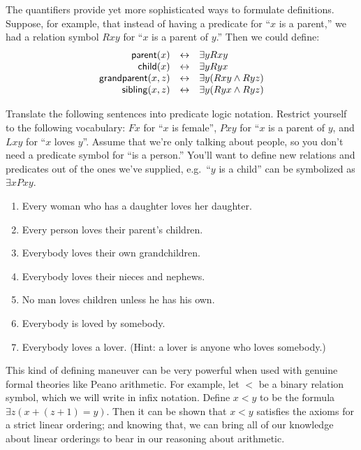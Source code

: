 The quantifiers provide yet more sophisticated ways to formulate
definitions.  Suppose, for example, that instead of having a predicate
for ``$x$ is a parent,'' we had a relation symbol $Rxy$ for ``$x$ is a
parent of $y$.''  Then we could define:
\[ \begin{array}{r c l}
     \mathsf{parent}(x) & \leftrightarrow & \exists yRxy \\
     \mathsf{child}(x)  & \leftrightarrow & \exists yRyx \\
     \mathsf{grandparent}(x,z) & \leftrightarrow & \exists y(Rxy\wedge Ryz) \\
     \mathsf{sibling}(x,z) & \leftrightarrow & \exists y(Ryx\wedge Ryz) \end{array} \]

\begin{exercises} Translate the following sentences into predicate
   logic notation.  Restrict yourself to the following vocabulary:
   $Fx$ for ``$x$ is female'', $Pxy$ for ``$x$ is a parent of $y$, and
   $Lxy$ for ``$x$ loves $y$''.  Assume that we're only talking about
   people, so you don't need a predicate symbol for ``is a person.''
   You'll want to define new relations and predicates out of the ones
   we've supplied, e.g.\ ``$y$ is a child'' can be symbolized as
   $\exists xPxy$.

 \begin{enumerate}
  
\item Every woman who has a daughter loves her daughter.

\item Every person loves their parent's children.  
  
\item Everybody loves their own grandchildren.
  
\item Everybody loves their nieces and nephews.
  
\item No man loves children unless he has his own.

\item Everybody is loved by somebody.   

\item Everybody loves a lover. (Hint: a lover is anyone who loves somebody.)  

\end{enumerate} \end{exercises}                               

This kind of defining maneuver can be very powerful when used with
genuine formal theories like Peano arithmetic.  For example, let $<$
be a binary relation symbol, which we will write in infix notation.
Define $x<y$ to be the formula $\exists z(x+(z+1)=y)$.  Then it can be
shown that $x<y$ satisfies the axioms for a strict linear ordering;
and knowing that, we can bring all of our knowledge about linear
orderings to bear in our reasoning about arithmetic.

